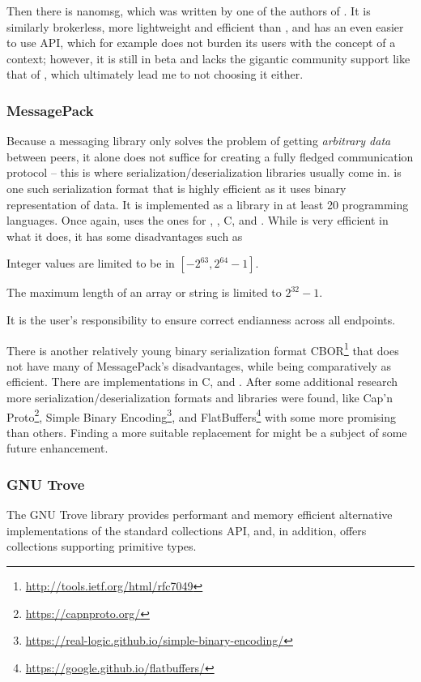 Then there is nanomsg\cite{nanomsg}, which was written by one of the authors of \zmq. 
It is similarly brokerless, more lightweight and efficient than \zmq, and has an even easier to use API, which
for example does not burden its users with the concept of a context; however, it is still in beta and lacks
the gigantic community support like that of \zmq, which ultimately lead me to not choosing it either.
\tocless\subsubsection{MessagePack}
\label{sec:msgpack}
Because a messaging library only solves the problem of getting \emph{arbitrary data} between peers, it 
alone does not suffice for creating a fully fledged communication protocol -- this is where
serialization/deserialization libraries usually come in. \msgpack{}\cite{msgpack} is one such serialization
format that is highly efficient as it uses binary representation of data. It is implemented as a library in at
least 20 programming languages. Once again, \xmlmate uses the ones for \java, \python, C, and \cpp.
While \msgpack is very efficient in what it does, it has some disadvantages such as 
\begin{itemize*}
  \item Integer values are limited to be in $[-2^{63}, 2^{64}-1]$.
  \item The maximum length of an array or string is limited to $2^{32}-1$.
  \item It is the user's responsibility to ensure correct endianness across all endpoints.
\end{itemize*}

There is another relatively young binary serialization format
CBOR\footnote{\url{http://tools.ietf.org/html/rfc7049}} that does not have many of MessagePack's
disadvantages, while being comparatively as efficient. There are implementations in C, \python and
\java.
After some additional research more serialization/deserialization formats and libraries were found, like
Cap'n Proto\footnote{\url{https://capnproto.org/}},
Simple Binary Encoding\footnote{\url{https://real-logic.github.io/simple-binary-encoding/}}, and
FlatBuffers\footnote{\url{https://google.github.io/flatbuffers/}} with some more promising than
others. Finding a more suitable replacement for \msgpack might be a subject of some future enhancement.
\tocless\subsubsection{GNU Trove}
\label{sec:trove}
The GNU Trove \java library provides performant and memory efficient alternative implementations of the
standard \java collections API, and, in addition, offers collections supporting primitive types. 


